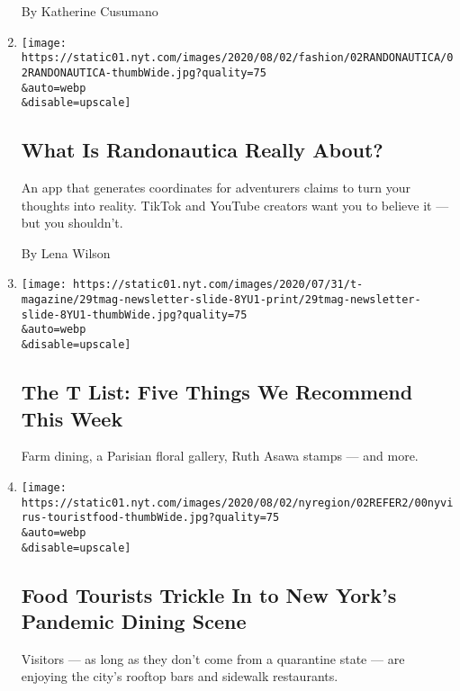 \begin{enumerate}
  By Katherine Cusumano
\item
  \href{/2020/07/31/style/randonautica-app.html}{}

  \texttt{[image: https://static01.nyt.com/images/2020/08/02/fashion/02RANDONAUTICA/02RANDONAUTICA-thumbWide.jpg?quality=75\\\&auto=webp\\\&disable=upscale]}

  \hypertarget{what-is-randonautica-really-about}{%
  \subsection{What Is Randonautica Really
  About?}\label{what-is-randonautica-really-about}}

  An app that generates coordinates for adventurers claims to turn your
  thoughts into reality. TikTok and YouTube creators want you to believe
  it --- but you shouldn't.

  By Lena Wilson
\item
  \href{/2020/07/30/t-magazine/the-t-list-five-things-we-recommend-this-week.html}{}

  \texttt{[image: https://static01.nyt.com/images/2020/07/31/t-magazine/29tmag-newsletter-slide-8YU1-print/29tmag-newsletter-slide-8YU1-thumbWide.jpg?quality=75\\\&auto=webp\\\&disable=upscale]}

  \hypertarget{the-t-list-five-things-we-recommend-this-week}{%
  \subsection{The T List: Five Things We Recommend This
  Week}\label{the-t-list-five-things-we-recommend-this-week}}

  Farm dining, a Parisian floral gallery, Ruth Asawa stamps --- and
  more.
\item
  \href{/2020/07/30/nyregion/coronavirus-nyc-tourism-restaurants.html}{}

  \texttt{[image: https://static01.nyt.com/images/2020/08/02/nyregion/02REFER2/00nyvirus-touristfood-thumbWide.jpg?quality=75\\\&auto=webp\\\&disable=upscale]}

  \hypertarget{food-tourists-trickle-in-to-new-yorks-pandemic-dining-scene}{%
  \subsection{Food Tourists Trickle In to New York's Pandemic Dining
  Scene}\label{food-tourists-trickle-in-to-new-yorks-pandemic-dining-scene}}

  Visitors --- as long as they don't come from a quarantine state ---
  are enjoying the city's rooftop bars and sidewalk restaurants.


\end{enumerate}
